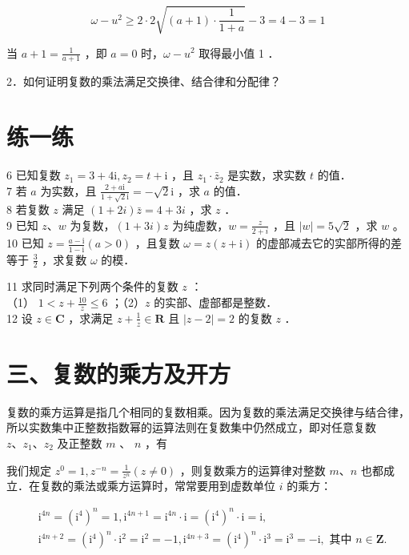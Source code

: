 \documentclass[10pt]{article}
\begin{document}
\[
\omega-u^{2} \geqslant 2 \cdot 2 \sqrt{(a+1) \cdot \frac{1}{1+a}}-3=4-3=1
\]

当 \(a+1=\frac{1}{a+1}\) ，即 \(a=0\) 时，\(\omega-u^{2}\) 取得最小值 1 ．

2．如何证明复数的乘法满足交换律、结合律和分配律？

\section*{练一练}
6 已知复数 \(z_{1}=3+4 \mathrm{i}, z_{2}=t+\mathrm{i}\) ，且 \(z_{1} \cdot \bar{z}_{2}\) 是实数，求实数 \(t\) 的值．\\
7 若 \(a\) 为实数，且 \(\frac{2+a \mathrm{i}}{1+\sqrt{2} \mathrm{i}}=-\sqrt{2} \mathrm{i}\) ，求 \(a\) 的值．\\
8 若复数 \(z\) 满足 \((1+2 i) \bar{z}=4+3 i\) ，求 \(z\) ．\\
9 已知 \(z 、 w\) 为复数，\((1+3 i) z\) 为纯虚数，\(w=\frac{z}{2+i}\) ，且 \(|w|=5 \sqrt{2}\) ，求 \(w\) 。\\
10 已知 \(z=\frac{a-\mathrm{i}}{1-\mathrm{i}}(a>0)\) ，且复数 \(\omega=z(z+\mathrm{i})\) 的虚部减去它的实部所得的差等于 \(\frac{3}{2}\) ，求复数 \(\omega\) 的模．

11 求同时满足下列两个条件的复数 \(z\) ：\\
（1） \(1<z+\frac{10}{z} \leqslant 6\) ；（2）\(z\) 的实部、虚部都是整数．\\
12 设 \(z \in \mathbf{C}\) ，求满足 \(z+\frac{1}{z} \in \mathbf{R}\) 且 \(|z-2|=2\) 的复数 \(z\) ．

\section*{三、复数的乘方及开方}
复数的乘方运算是指几个相同的复数相乘。因为复数的乘法满足交换律与结合律，所以实数集中正整数指数幂的运算法则在复数集中仍然成立，即对任意复数 \(z 、 z_{1} 、 z_{2}\) 及正整数 \(m\) 、 \(n\) ，有

我们规定 \(z^{0}=1, z^{-n}=\frac{1}{z^{n}}(z \neq 0)\) ，则复数乘方的运算律对整数 \(m 、 n\) 也都成立．在复数的乘法或乘方运算时，常常要用到虚数单位 \(i\) 的乘方：

\[
\begin{aligned}
& \mathrm{i}^{4 n}=\left(\mathrm{i}^{4}\right)^{n}=1, \mathrm{i}^{4 n+1}=\mathrm{i}^{4 n} \cdot \mathrm{i}=\left(\mathrm{i}^{4}\right)^{n} \cdot \mathrm{i}=\mathrm{i}, \\
& \mathrm{i}^{4 n+2}=\left(\mathrm{i}^{4}\right)^{n} \cdot \mathrm{i}^{2}=\mathrm{i}^{2}=-1, \mathrm{i}^{4 n+3}=\left(\mathrm{i}^{4}\right)^{n} \cdot \mathrm{i}^{3}=\mathrm{i}^{3}=-\mathrm{i}, \text { 其中 } n \in \mathbf{Z} .
\end{aligned}
\]
\end{document}
